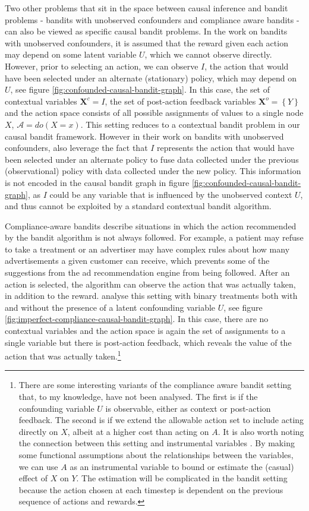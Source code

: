 \documentclass[11pt,a4paper,twoside]{report}
\newcommand{\actionspace}{\mathcal{A}}
\newcommand{\set}[1]{\left\{#1\right\}}
\renewcommand{\vec}[1]{\boldsymbol{#1}}
\theoremstyle{plain}
\theoremstyle{definition}
\begin{document}
Two other problems that sit in the space between causal inference and bandit problems - bandits with unobserved confounders \cite{Bareinboim2015} and compliance aware bandits  \citep{DellaPenna2016} - can also be viewed as specific causal bandit problems. In the work on bandits with unobserved confounders, it is assumed that the reward given each action may depend on some latent variable $U$, which we cannot observe directly. However, prior to selecting an action, we can observe  $I$, the action that would have been selected under an alternate (stationary) policy, which may depend on $U$, see figure \ref{fig:confounded-causal-bandit-graph}. In this case, the set of contextual variables $\vec{X}^c = I$, the set of post-action feedback variables $\vec{X}^o = \set{Y}$ and the action space consists of all possible assignments of values to a single node $X$, $\actionspace = do(X=x)$. This setting reduces to a contextual bandit problem in our causal bandit framework. However in their work on bandits with unobserved confounders, \citet{Forney2017} also leverage the fact that $I$ represents the action that would have been selected under an alternate policy to fuse data collected under the previous (observational) policy with data collected under the new policy. This information is not encoded in the causal bandit graph in figure \ref{fig:confounded-causal-bandit-graph}, as $I$ could be any variable that is influenced by the unobserved context $U$, and thus cannot be exploited by a standard contextual bandit algorithm. 

Compliance-aware bandits describe situations in which the action recommended by the bandit algorithm is not always followed. For example, a patient may refuse to take a treatment or an advertiser may have complex rules about how many advertisements a given customer can receive, which prevents some of the suggestions from the ad recommendation engine from being followed. After an action is selected, the algorithm can observe the action that was actually taken, in addition to the reward. \citet{DellaPenna2016} analyse this setting with binary treatments both with and without the presence of a latent confounding variable $U$, see figure \ref{fig:imperfect-compliance-causal-bandit-graph}. In this case, there are no contextual variables and the action space is again the set of assignments to a single variable but there is post-action feedback, which reveals the value of the action that was actually taken.\footnote{There are some interesting variants of the compliance aware bandit setting that, to my knowledge, have not been analysed. The first is if the confounding variable $U$ is observable, either as context or post-action feedback. The second is if we extend the allowable action set to include acting directly on $X$, albeit at a higher cost than acting on $A$. It is also worth noting the connection between this setting and instrumental variables \cite{balke1997bounds}. By making some functional assumptions about the relationships between the variables, we can use $A$ as an instrumental variable to bound or estimate the (casual) effect of $X$ on $Y$. The estimation will be complicated in the bandit setting because the action chosen at each timestep is dependent on the previous sequence of actions and rewards.}
\end{document}
